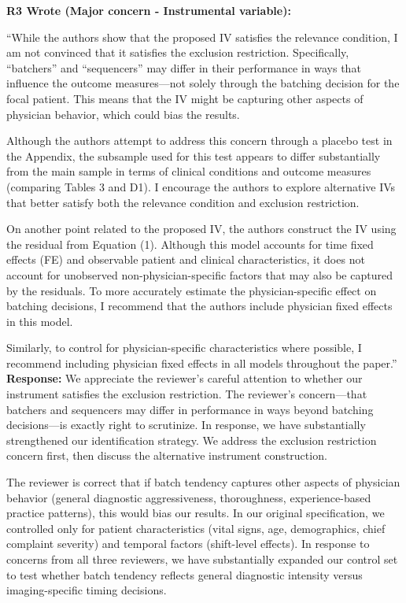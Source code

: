 \documentclass[11pt]{article}
\newenvironment{quote2}
{ \bigskip
\noindent
         \small\em
         \baselineskip=14pt
}
\newcommand{\1}{\hbox{\rm 1\kern-.35em 1}}
\begin{document}
\color{black}

\begin{quote2}
\textbf{R3 Wrote (Major concern - Instrumental variable):}  

\noindent``While the authors show that the proposed IV satisfies the relevance condition, I am not convinced that it satisfies the exclusion restriction. Specifically, ``batchers'' and ``sequencers'' may differ in their performance in ways that influence the outcome measures—not solely through the batching decision for the focal patient. This means that the IV might be capturing other aspects of physician behavior, which could bias the results.

Although the authors attempt to address this concern through a placebo test in the Appendix, the subsample used for this test appears to differ substantially from the main sample in terms of clinical conditions and outcome measures (comparing Tables 3 and D1). I encourage the authors to explore alternative IVs that better satisfy both the relevance condition and exclusion restriction.

On another point related to the proposed IV, the authors construct the IV using the residual from Equation (1). Although this model accounts for time fixed effects (FE) and observable patient and clinical characteristics, it does not account for unobserved non-physician-specific factors that may also be captured by the residuals. To more accurately estimate the physician-specific effect on batching decisions, I recommend that the authors include physician fixed effects in this model.

Similarly, to control for physician-specific characteristics where possible, I recommend including physician fixed effects in all models throughout the paper.''
\end{quote2}

\noindent\textbf{Response:} \color{blue}We appreciate the reviewer's careful attention to whether our instrument satisfies the exclusion restriction. The reviewer's concern---that batchers and sequencers may differ in performance in ways beyond batching decisions---is exactly right to scrutinize. In response, we have substantially strengthened our identification strategy. We address the exclusion restriction concern first, then discuss the alternative instrument construction.

The reviewer is correct that if batch tendency captures other aspects of physician behavior (general diagnostic aggressiveness, thoroughness, experience-based practice patterns), this would bias our results. In our original specification, we controlled only for patient characteristics (vital signs, age, demographics, chief complaint severity) and temporal factors (shift-level effects). In response to concerns from all three reviewers, we have substantially expanded our control set to test whether batch tendency reflects general diagnostic intensity versus imaging-specific timing decisions.
\end{document}
